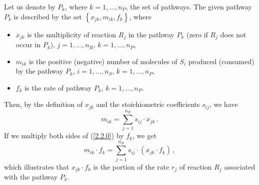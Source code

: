 Let us denote by $P_k$, where $k = 1,\ldots, n_P$, the set of pathways. The given pathway $P_k$ is described by the set $\left\{x_{jk}, m_{ik}, f_k \right\}$, where 
\begin{itemize}
\item {$x_{jk}$ is the multiplicity of reaction $R_j$ in the pathway $P_k$ (zero if $R_j$ does not occur in $P_k$), $j = 1,\ldots, n_R$, $k = 1,\ldots, n_P$,}
\item {$m_{ik}$ is the positive (negative) number of molecules of $S_i$ produced (consumed) by the pathway $P_k$, $i = 1,\ldots, n_S$, $k = 1,\ldots, n_P$,}
\item {$f_k$ is the rate of pathway $P_k$, $k = 1,\ldots, n_P$.}
\end{itemize}

Then, by the definition of $x_{jk}$ and the stoichiometric coefficients $s_{ij}$, we have
\begin{equation}
m_{ik} =\sum_{j = 1}^{n_R}s_{ij}\cdot x_{jk}\,.
\label{2.2.0}
\end{equation}   
If we multiply both sides of (\ref{2.2.0}) by $f_k$, we get
\begin{equation}
m_{ik}\cdot f_k =\sum_{j = 1}^{n_R}s_{ij}\cdot (x_{jk}\cdot f_k)\,,
\label{2.2.1}
\end{equation}
which illustrates that $x_{jk}\cdot f_k$ is the portion of the rate $r_j$ of reaction $R_j$ associated with the pathway $P_k$.

